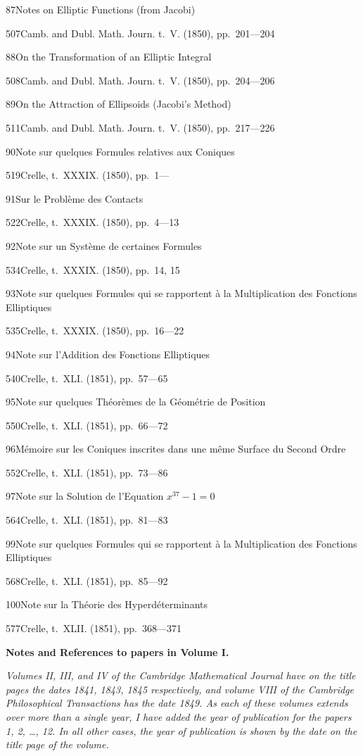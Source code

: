\documentclass[11pt,a4paper]{book}
\providecommand{\tocentry}[2]{#1\dotfill #2\par}
\begin{document}
\tocentry{87}{Notes on Elliptic Functions (from Jacobi)}{507}{Camb. and Dubl. Math. Journ. t.~V. (1850), pp.~201---204}

\tocentry{88}{On the Transformation of an Elliptic Integral}{508}{Camb. and Dubl. Math. Journ. t.~V. (1850), pp.~204---206}

\tocentry{89}{On the Attraction of Ellipsoids (Jacobi's Method)}{511}{Camb. and Dubl. Math. Journ. t.~V. (1850), pp.~217---226}

\tocentry{90}{Note sur quelques Formules relatives aux Coniques}{519}{Crelle, t.~XXXIX. (1850), pp.~1---}

\tocentry{91}{Sur le Probl\`{e}me des Contacts}{522}{Crelle, t.~XXXIX. (1850), pp.~4---13}

\tocentry{92}{Note sur un Syst\`{e}me de certaines Formules}{534}{Crelle, t.~XXXIX. (1850), pp.~14, 15}

\tocentry{93}{Note sur quelques Formules qui se rapportent \`{a} la Multiplication des Fonctions Elliptiques}{535}{Crelle, t.~XXXIX. (1850), pp.~16---22}

\tocentry{94}{Note sur l'Addition des Fonctions Elliptiques}{540}{Crelle, t.~XLI. (1851), pp.~57---65}

\tocentry{95}{Note sur quelques Th\'{e}or\`{e}mes de la G\'{e}om\'{e}trie de Position}{550}{Crelle, t.~XLI. (1851), pp.~66---72}

\newpage

\tocentry{96}{M\'{e}moire sur les Coniques inscrites dans une m\^{e}me Surface du Second Ordre}{552}{Crelle, t.~XLI. (1851), pp.~73---86}

\tocentry{97}{Note sur la Solution de l'Equation $x^{37}-1=0$}{564}{Crelle, t.~XLI. (1851), pp.~81---83}


\tocentry{99}{Note sur quelques Formules qui se rapportent \`{a} la Multiplication des Fonctions Elliptiques}{568}{Crelle, t.~XLI. (1851), pp.~85---92}

\tocentry{100}{Note sur la Th\'{e}orie des Hyperd\'{e}terminants}{577}{Crelle, t.~XLII. (1851), pp.~368---371}

\vspace{1cm}
\noindent\textbf{Notes and References to papers in Volume I.} 

\vspace{0.5cm}
\noindent\textit{Volumes II, III, and IV of the Cambridge Mathematical Journal have on the title pages the dates 1841, 1843, 1845 respectively, and volume VIII of the Cambridge Philosophical Transactions has the date 1849. As each of these volumes extends over more than a single year, I have added the year of publication for the papers 1, 2, \dots, 12. In all other cases, the year of publication is shown by the date on the title page of the volume.}
\end{document}
